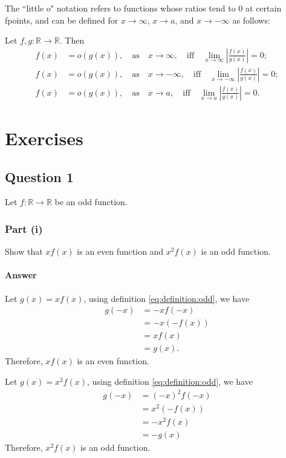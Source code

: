 The ``little o" notation refers to functions whose ratios tend to 0 at certain fpoints, and can be defined for $ x \rightarrow \infty $, $ x \rightarrow a $, and $ x \rightarrow -\infty $ as follows:
\begin{definition}
    Let $ f,g : \mathbb{R} \rightarrow \mathbb{R} $.
    Then
    \begin{align}
        f(x) &= o(g(x)), \quad \text{as} \quad x \rightarrow \infty, \quad \text{iff} \quad \lim_{x \rightarrow \infty} \left| \frac{f(x)}{g(x)} \right| = 0; \\
        f(x) &= o(g(x)), \quad \text{as} \quad x \rightarrow -\infty, \quad \text{iff} \quad \lim_{x \rightarrow -\infty} \left| \frac{f(x)}{g(x)} \right| = 0; \\
        f(x) &= o(g(x)), \quad \text{as} \quad x \rightarrow a, \quad \text{iff} \quad \lim_{x \rightarrow a} \left| \frac{f(x)}{g(x)} \right| = 0.
    \end{align}
\end{definition}


\section{Exercises}
\subsection{Question 1}
Let $ f : \mathbb{R} \rightarrow \mathbb{R} $ be an odd function.

\subsubsection{Part (i)}
Show that $ x f(x) $ is an even function and $ x^2 f(x) $ is an odd function.

\paragraph{Answer}
Let $ g(x) = x f(x) $, using definition \eqref{eq:definition:odd}, we have
\begin{align*}
    g(-x) &= -x f(-x) \\
          &= -x (-f(x)) \\
          &= x f(x) \\
          &= g(x).
\end{align*}
Therefore, $ x f(x) $ is an even function.

Let $ g(x) = x^2 f(x) $, using definition \eqref{eq:definition:odd}, we have
\begin{align*}
    g(-x) &= (-x)^2 f(-x) \\
          &= x^2 (-f(x)) \\
          &= -x^2 f(x) \\
          &= -g(x)
\end{align*}
Therefore, $ x^2 f(x) $ is an odd function.

